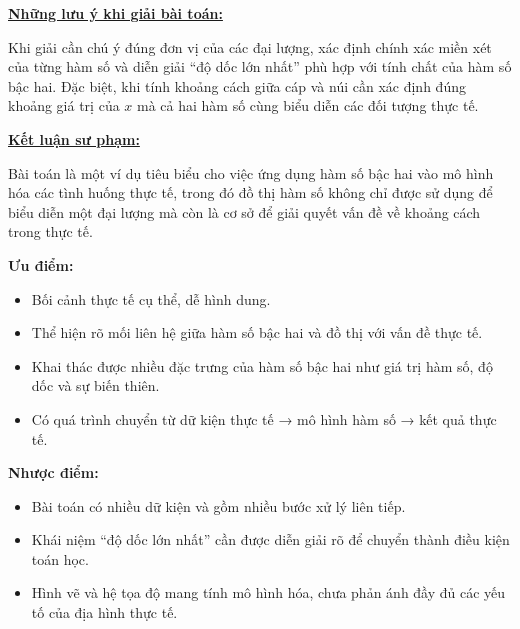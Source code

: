 \documentclass[12pt,a4paper,oneside]{book}
\theoremstyle{theorem}
\theoremstyle{definition}
\begin{document}
        \textbf{\underline{Những lưu ý khi giải bài toán:}}

        Khi giải cần chú ý đúng đơn vị của các đại lượng, xác định chính xác miền xét của từng hàm số và diễn giải “độ dốc lớn nhất” phù hợp với tính chất của hàm số bậc hai. Đặc biệt, khi tính khoảng cách giữa cáp và núi cần xác định đúng khoảng giá trị của \(x\) mà cả hai hàm số cùng biểu diễn các đối tượng thực tế.
        
        \textbf{\underline{Kết luận sư phạm:}}

       Bài toán là một ví dụ tiêu biểu cho việc ứng dụng hàm số bậc hai vào mô hình hóa các tình huống thực tế, trong đó đồ thị hàm số không chỉ được sử dụng để biểu diễn một đại lượng mà còn là cơ sở để giải quyết vấn đề về khoảng cách trong thực tế.
        
        \textbf{Ưu điểm:}
        \begin{itemize}
            \item Bối cảnh thực tế cụ thể, dễ hình dung.
            \item Thể hiện rõ mối liên hệ giữa hàm số bậc hai và đồ thị với vấn đề thực tế.
            \item Khai thác được nhiều đặc trưng của hàm số bậc hai như giá trị hàm số, độ dốc và sự biến thiên.
            \item Có quá trình chuyển từ dữ kiện thực tế → mô hình hàm số → kết quả thực tế.
        \end{itemize}
        
        \textbf{Nhược điểm:}
        \begin{itemize}
            \item Bài toán có nhiều dữ kiện và gồm nhiều bước xử lý liên tiếp.
            \item Khái niệm “độ dốc lớn nhất” cần được diễn giải rõ để chuyển thành điều kiện toán học.
            \item Hình vẽ và hệ tọa độ mang tính mô hình hóa, chưa phản ánh đầy đủ các yếu tố của địa hình thực tế.
        \end{itemize}
\end{document}
